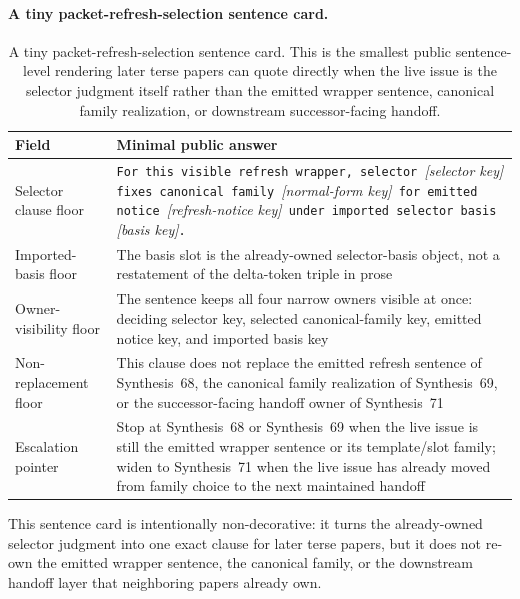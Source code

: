 \documentclass[11pt]{article}
\begin{document}
\paragraph{A tiny packet-refresh-selection sentence card.}
\begin{table}[t]
\centering
\small
\begin{tabularx}{\linewidth}{@{}lX@{}}
\toprule
Field & Minimal public answer \\
\midrule
Selector clause floor & \texttt{For this visible refresh wrapper, selector }\emph{[selector key]}\texttt{ fixes canonical family }\emph{[normal-form key]}\texttt{ for emitted notice }\emph{[refresh-notice key]}\texttt{ under imported selector basis }\emph{[basis key]}\texttt{.} \\
Imported-basis floor & The basis slot is the already-owned selector-basis object, not a restatement of the delta-token triple in prose \\
Owner-visibility floor & The sentence keeps all four narrow owners visible at once: deciding selector key, selected canonical-family key, emitted notice key, and imported basis key \\
Non-replacement floor & This clause does not replace the emitted refresh sentence of Synthesis~68, the canonical family realization of Synthesis~69, or the successor-facing handoff owner of Synthesis~71 \\
Escalation pointer & Stop at Synthesis~68 or Synthesis~69 when the live issue is still the emitted wrapper sentence or its template/slot family; widen to Synthesis~71 when the live issue has already moved from family choice to the next maintained handoff \\
\bottomrule
\end{tabularx}
\caption{A tiny packet-refresh-selection sentence card. This is the smallest public sentence-level rendering later terse papers can quote directly when the live issue is the selector judgment itself rather than the emitted wrapper sentence, canonical family realization, or downstream successor-facing handoff.}
\label{tab:tiny-packet-refresh-selection-sentence-card}
\end{table}

This sentence card is intentionally non-decorative: it turns the already-owned selector judgment into one exact clause for later terse papers, but it does not re-own the emitted wrapper sentence, the canonical family, or the downstream handoff layer that neighboring papers already own.\cite{series:workedexample}
\end{document}
